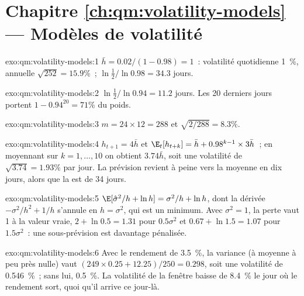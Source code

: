 \section*{Chapitre \ref{ch:qm:volatility-models} --- Modèles de volatilité}

\begin{solution}{exo:qm:volatility-models:1}
$\bar h = 0.02/(1 - 0.98) = 1$~: volatilité quotidienne 1~\%, annuelle $\sqrt{252} = 15.9\%$~;  $\ln\frac12/\ln0.98 = 34.3$ jours.
\end{solution}

\begin{solution}{exo:qm:volatility-models:2}
$\ln\frac12/\ln0.94 = 11.2$ jours. Les 20 derniers jours portent $1 - 0.94^{20} = 71\%$ du poids.
\end{solution}

\begin{solution}{exo:qm:volatility-models:3}
$m = 24 \times 12 = 288$ et $\sqrt{2/288} = 8.3\%$.
\end{solution}

\begin{solution}{exo:qm:volatility-models:4}
$h_{t+1} = 4\bar h$ et $\E_t[h_{t+k}] = \bar h + 0.98^{k-1} \times 3\bar h$~; en moyennant sur $k = 1, \dots, 10$ on obtient $3.74\bar h$, soit une volatilité de $\sqrt{3.74} = 1.93\%$
par jour. La prévision revient à peine vers la moyenne en dix jours, alors que la  est de 34 jours.
\end{solution}

\begin{solution}{exo:qm:volatility-models:5}
$\E[\hat\sigma^2/h + \ln h] = \sigma^2/h + \ln h$, dont la dérivée $-\sigma^2/h^2 + 1/h$ s'annule en $h = \sigma^2$, qui est un minimum. Avec $\sigma^2 = 1$, la perte vaut 1 à la
valeur vraie, $2 + \ln0.5 = 1.31$ pour $0.5\sigma^2$ et $0.67 + \ln1.5 = 1.07$ pour $1.5\sigma^2$~: une sous-prévision est davantage pénalisée.
\end{solution}

\begin{solution}{exo:qm:volatility-models:6}
Avec le rendement de 3.5~\%, la variance (à moyenne à peu près nulle) vaut $(249 \times 0.25 + 12.25)/250 = 0.298$, soit une volatilité de 0.546~\%~; sans lui, 0.5~\%. La
volatilité de la fenêtre baisse de 8.4~\% le jour où le rendement sort, quoi qu'il arrive ce jour-là.
\end{solution}

